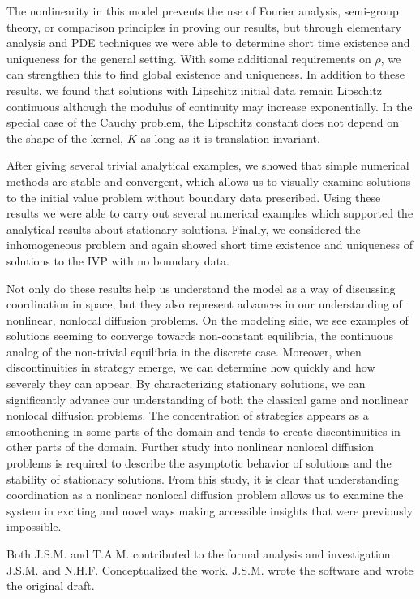\documentclass[aps,
preprint,
groupedaddress,
showkeys,
amsmath]{revtex4-2}
\begin{document}
    The nonlinearity in this model prevents the use of Fourier analysis, semi-group theory, or comparison principles in proving our results, but through elementary analysis and PDE techniques we were able to determine short time existence and uniqueness for the general setting. With some additional requirements on $\rho$, we can strengthen this to find global existence and uniqueness. In addition to these results, we found that solutions with Lipschitz initial data remain Lipschitz continuous although the modulus of continuity may increase exponentially. In the special case of the Cauchy problem, the Lipschitz constant does not depend on the shape of the kernel, $K$ as long as it is translation invariant. 

    After giving several trivial analytical examples, we showed that simple numerical methods are stable and convergent, which allows us to visually examine solutions to the initial value problem without boundary data prescribed. Using these results we were able to carry out several numerical examples which supported the analytical results about stationary solutions. Finally, we considered the inhomogeneous problem and again showed short time existence and uniqueness of solutions to the IVP with no boundary data.

    Not only do these results help us understand the model as a way of discussing coordination in space, but they also represent advances in our understanding of nonlinear, nonlocal diffusion problems. On the modeling side, we see examples of solutions seeming to converge towards non-constant equilibria, the continuous analog of the non-trivial equilibria in the discrete case. Moreover, when discontinuities in strategy emerge, we can determine how quickly and how severely they can appear.  By characterizing stationary solutions, we can significantly advance our understanding of both the classical game and nonlinear nonlocal diffusion problems. The concentration of strategies appears as a smoothening in some parts of the domain and tends to create discontinuities in other parts of the domain. Further study into nonlinear nonlocal diffusion problems is required to describe the asymptotic behavior of solutions and the stability of stationary solutions. From this study, it is clear that understanding coordination as a nonlinear nonlocal diffusion problem allows us to examine the system in exciting and novel ways making accessible insights that were previously impossible.  



Both J.S.M. and T.A.M. contributed to the formal analysis and investigation. J.S.M. and N.H.F. Conceptualized the work. J.S.M. wrote the software and wrote the original draft.\newline
\end{document}
